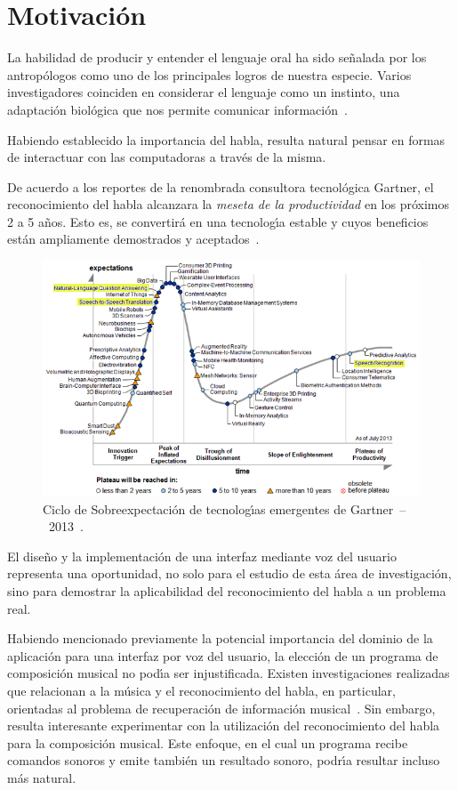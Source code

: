 \section{Motivaci\'on}
\label{sec:motivacion}

La habilidad de producir y entender el lenguaje oral ha sido se\~nalada por los antrop\'ologos
como uno de los principales logros de nuestra especie. Varios investigadores coinciden
en considerar el lenguaje como un instinto, una adaptaci\'on biol\'ogica que nos permite
comunicar \mbox{informaci\'on \cite{GabrielVoice2007}}.

Habiendo establecido la importancia del habla, resulta natural pensar en formas de
interactuar con las computadoras a trav\'es de la misma.

De acuerdo a los reportes de la renombrada consultora tecnol\'ogica Gartner, el reconocimiento
del habla alcanzara la  \emph{meseta de la productividad} en los pr\'oximos 2 a 5 a\~nos. Esto es,
se convertir\'a en una tecnolog{\'\i}a estable y cuyos beneficios est\'an ampliamente demostrados
y \mbox{aceptados \cite{Gartner2013}}.

\begin{figure}[ht]
\centering
\includegraphics[width=0.8\linewidth]{./graphics/gartner.png}
\caption{Ciclo de Sobreexpectaci\'on de tecnolog{\'\i}as emergentes de \mbox{Gartner -- 2013 \cite{Gartner2013}.}}
\label{figure:gartner}
\end{figure}

El dise\~no y la implementaci\'on de una interfaz mediante voz del usuario representa
una oportunidad, no solo para el estudio de esta \'area de investigaci\'on, sino para
demostrar la aplicabilidad del reconocimiento del habla a un problema real.

Habiendo mencionado previamente la potencial importancia del dominio de la aplicaci\'on
para una interfaz por voz del usuario, la elecci\'on de un programa de composici\'on musical
no pod{\'\i}a ser injustificada.
Existen investigaciones realizadas que relacionan a la m\'usica y el reconocimiento
del habla, en particular, orientadas al problema de recuperaci\'on de informaci\'on
\mbox{musical \cite{Goto2004Speech, Schuller2003Hybrid}}.
Sin embargo, resulta interesante experimentar con la utilizaci\'on del reconocimiento
del habla para la composici\'on musical. Este enfoque, en el cual un programa recibe comandos
sonoros y emite tambi\'en un resultado sonoro, podr{\'\i}a resultar incluso m\'as natural.

